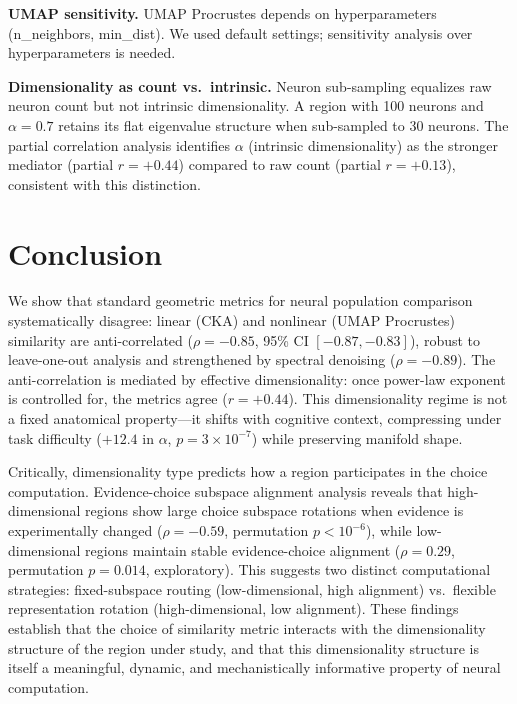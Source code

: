 \documentclass{article}
\begin{document}
\textbf{UMAP sensitivity.} UMAP Procrustes depends on hyperparameters (n\_neighbors, min\_dist). We used default settings; sensitivity analysis over hyperparameters is needed.

\textbf{Dimensionality as count vs.\ intrinsic.} Neuron sub-sampling equalizes raw neuron count but not intrinsic dimensionality. A region with 100 neurons and $\alpha = 0.7$ retains its flat eigenvalue structure when sub-sampled to 30 neurons. The partial correlation analysis identifies $\alpha$ (intrinsic dimensionality) as the stronger mediator (partial $r = +0.44$) compared to raw count (partial $r = +0.13$), consistent with this distinction.

\section{Conclusion}

We show that standard geometric metrics for neural population comparison systematically disagree: linear (CKA) and nonlinear (UMAP Procrustes) similarity are anti-correlated ($\rho = -0.85$, 95\% CI $[-0.87, -0.83]$), robust to leave-one-out analysis and strengthened by spectral denoising ($\rho = -0.89$). The anti-correlation is mediated by effective dimensionality: once power-law exponent is controlled for, the metrics agree ($r = +0.44$). This dimensionality regime is not a fixed anatomical property---it shifts with cognitive context, compressing under task difficulty ($+12.4$ in $\alpha$, $p = 3 \times 10^{-7}$) while preserving manifold shape.

Critically, dimensionality type predicts how a region participates in the choice computation. Evidence-choice subspace alignment analysis reveals that high-dimensional regions show large choice subspace rotations when evidence is experimentally changed ($\rho = -0.59$, permutation $p < 10^{-6}$), while low-dimensional regions maintain stable evidence-choice alignment ($\rho = 0.29$, permutation $p = 0.014$, exploratory). This suggests two distinct computational strategies: fixed-subspace routing (low-dimensional, high alignment) vs.\ flexible representation rotation (high-dimensional, low alignment). These findings establish that the choice of similarity metric interacts with the dimensionality structure of the region under study, and that this dimensionality structure is itself a meaningful, dynamic, and mechanistically informative property of neural computation.



\end{document}
